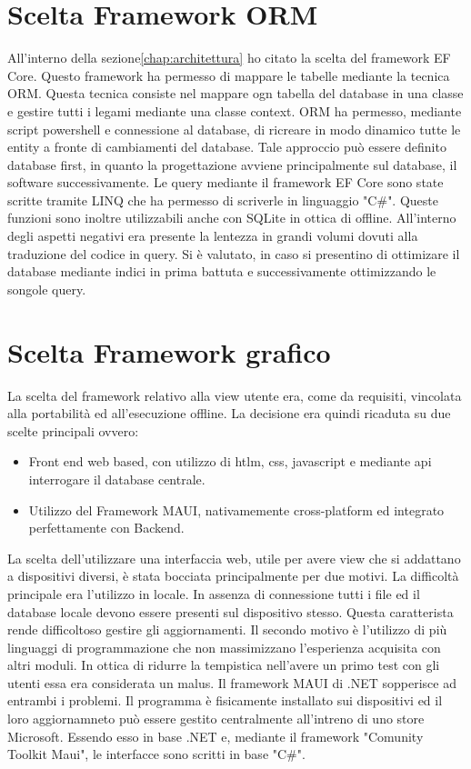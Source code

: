 \section{Scelta Framework ORM}
All'interno della sezione\ref{chap:architettura} ho citato la scelta del framework \ac{EF Core}.
Questo framework ha permesso di mappare le tabelle mediante la tecnica \ac{ORM}.
Questa tecnica consiste nel mappare ogn tabella del database in una classe 
e gestire tutti i legami mediante una classe context.
\Ac{ORM} ha permesso, mediante script powershell e connessione al database, 
di ricreare in modo dinamico tutte le entity a fronte di cambiamenti del database.
Tale approccio può essere definito database first, in quanto la progettazione avviene principalmente sul database, 
il software successivamente.
Le query mediante il framework \ac{EF Core} sono state scritte tramite \ac{LINQ} che ha permesso di scriverle in linguaggio "C\#".
Queste funzioni sono inoltre utilizzabili anche con SQLite in ottica di offline.
All'interno degli aspetti negativi era presente la lentezza in grandi volumi dovuti alla traduzione del codice in query.
Si è valutato, in caso si presentino di ottimizare il database mediante indici in prima battuta
 e successivamente ottimizzando le songole query.

 

\section{Scelta Framework grafico} %
La scelta del framework relativo alla view utente era, come da requisiti, vincolata alla portabilità ed all'esecuzione offline.
La decisione era quindi ricaduta su due scelte principali ovvero:
\begin{itemize}
    \item Front end web based, con utilizzo di htlm, css, javascript e mediante api interrogare il database centrale.
    \item Utilizzo del Framework MAUI, nativamemente cross-platform ed integrato perfettamente con Backend.
\end{itemize}
La scelta dell'utilizzare una interfaccia web, utile per avere view che si addattano a dispositivi diversi,
 è stata bocciata principalmente per due motivi.
La difficoltà principale era l'utilizzo in locale. In assenza di connessione tutti i file ed il database locale devono essere presenti sul dispositivo stesso.
Questa caratterista rende difficoltoso gestire gli aggiornamenti.
Il secondo motivo è l'utilizzo di più linguaggi di programmazione che non massimizzano l'esperienza acquisita con altri moduli.
In ottica di ridurre la tempistica nell'avere un primo test con gli utenti essa era considerata un malus.
Il framework MAUI di .NET sopperisce ad entrambi i problemi.
Il programma è fisicamente installato sui dispositivi ed il loro aggiornamneto
 può essere gestito centralmente  all'intreno di uno store Microsoft.
 Essendo esso in base .NET e, mediante il framework "Comunity Toolkit Maui", le interfacce sono scritti in base "C\#".
